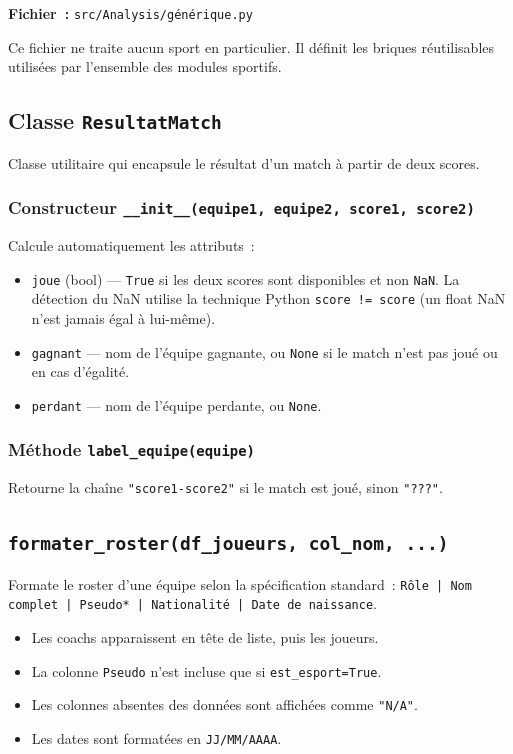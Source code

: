 \documentclass[12pt,a4paper]{article}
\begin{document}
\textbf{Fichier~:} \texttt{src/Analysis/générique.py}

Ce fichier ne traite aucun sport en particulier. Il définit les briques
réutilisables utilisées par l'ensemble des modules sportifs.

\subsection{Classe \texttt{ResultatMatch}}

Classe utilitaire qui encapsule le résultat d'un match à partir de deux scores.

\subsubsection{Constructeur \texttt{\_\_init\_\_(equipe1, equipe2, score1, score2)}}
Calcule automatiquement les attributs~:
\begin{itemize}
    \item \texttt{joue} (bool) — \texttt{True} si les deux scores sont disponibles
    et non \texttt{NaN}. La détection du NaN utilise la technique Python
    \texttt{score != score} (un float NaN n'est jamais égal à lui-même).
    \item \texttt{gagnant} — nom de l'équipe gagnante, ou \texttt{None} si le
    match n'est pas joué ou en cas d'égalité.
    \item \texttt{perdant} — nom de l'équipe perdante, ou \texttt{None}.
\end{itemize}

\subsubsection{Méthode \texttt{label\_equipe(equipe)}}
Retourne la chaîne \texttt{"score1-score2"} si le match est joué, sinon
\texttt{"???"}.

\subsection{\texttt{formater\_roster(df\_joueurs, col\_nom, ...)}}

Formate le roster d'une équipe selon la spécification standard~:
\texttt{Rôle | Nom complet | Pseudo* | Nationalité | Date de naissance}.

\begin{itemize}
    \item Les coachs apparaissent en tête de liste, puis les joueurs.
    \item La colonne \texttt{Pseudo} n'est incluse que si \texttt{est\_esport=True}.
    \item Les colonnes absentes des données sont affichées comme \texttt{"N/A"}.
    \item Les dates sont formatées en \texttt{JJ/MM/AAAA}.
\end{itemize}
\end{document}
